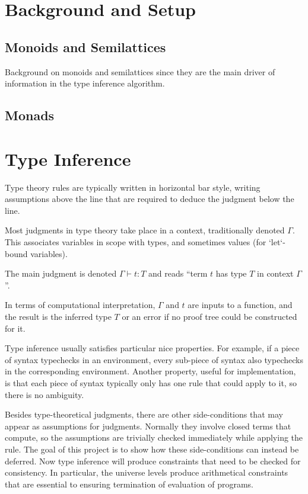 \documentclass[11pt, twoside, reqno]{book}
\begin{document}
\chapter{Background and Setup}

\section{Monoids and Semilattices}

Background on monoids and semilattices since they are the main driver of information in the type inference algorithm.

\section{Monads}

\chapter{Type Inference}
\label{type-inf}

Type theory rules are typically written in horizontal bar style, writing assumptions above the line that are required to deduce the judgment below the line.

Most judgments in type theory take place in a context, traditionally denoted \(\Gamma\).
This associates variables in scope with types, and sometimes values (for \inHS`let`-bound variables).

The main judgment is denoted \(\Gamma \vdash t : T\) and reads ``term \(t\) has type \(T\) in context \(\Gamma\)''.

In terms of computational interpretation, \(\Gamma\) and \(t\) are inputs to a function, and the result is the inferred type \(T\) or an error if no proof tree could be constructed for it.

Type inference usually satisfies particular nice properties.
For example, if a piece of syntax typechecks in an environment, every sub-piece of syntax also typechecks in the corresponding environment.
Another property, useful for implementation, is that each piece of syntax typically only has one rule that could apply to it, so there is no ambiguity.

Besides type-theoretical judgments, there are other side-conditions that may appear as assumptions for judgments.
Normally they involve closed terms that compute, so the assumptions are trivially checked immediately while applying the rule.
The goal of this project is to show how these side-conditions can instead be deferred.
Now type inference will produce constraints that need to be checked for consistency.
In particular, the universe levels produce arithmetical constraints that are essential to ensuring termination of evaluation of programs.
\end{document}
